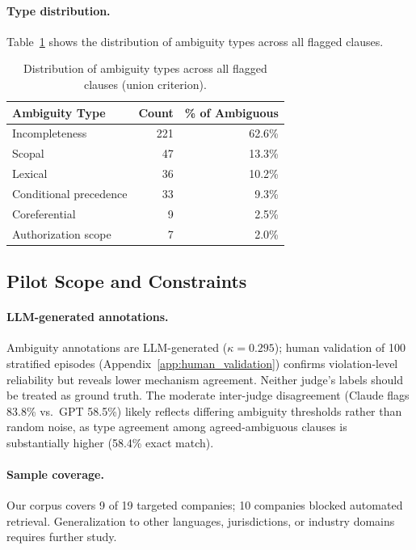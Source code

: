 \paragraph{Type distribution.}
Table~\ref{tab:type_distribution} shows the distribution of ambiguity types across all flagged clauses.

\begin{table}[!ht]
\centering
\footnotesize
\begin{tabular}{lrr}
\toprule
\textbf{Ambiguity Type} & \textbf{Count} & \textbf{\% of Ambiguous} \\
\midrule
Incompleteness          & 221 & 62.6\% \\
Scopal                  & 47 & 13.3\% \\
Lexical                 & 36 & 10.2\% \\
Conditional precedence  & 33 & 9.3\% \\
Coreferential           & 9 & 2.5\% \\
Authorization scope     & 7 & 2.0\% \\
\bottomrule
\end{tabular}
\caption{Distribution of ambiguity types across all flagged clauses (union criterion).}
\label{tab:type_distribution}
\end{table}

\subsection{Pilot Scope and Constraints}

\paragraph{LLM-generated annotations.}
Ambiguity annotations are LLM-generated ($\kappa = 0.295$); human validation of 100 stratified episodes (Appendix~\ref{app:human_validation}) confirms violation-level reliability but reveals lower mechanism agreement. Neither judge's labels should be treated as ground truth. The moderate inter-judge disagreement (Claude flags 83.8\% vs.\ GPT 58.5\%) likely reflects differing ambiguity thresholds rather than random noise, as type agreement among agreed-ambiguous clauses is substantially higher (58.4\% exact match).

\paragraph{Sample coverage.}
Our corpus covers 9 of 19 targeted companies; 10 companies blocked automated retrieval. Generalization to other languages, jurisdictions, or industry domains requires further study.

